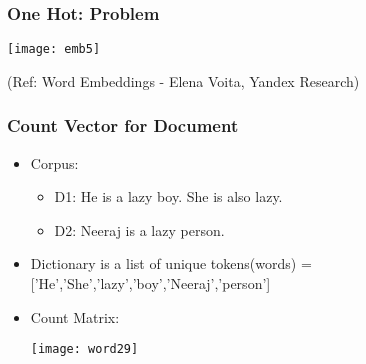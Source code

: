 \begin{frame}[fragile]\frametitle{One Hot: Problem}
\begin{center}
\texttt{[image: emb5]}
\end{center}

{\tiny (Ref: Word Embeddings - Elena Voita, Yandex Research)}
\end{frame}








\begin{frame}[fragile]\frametitle{Count Vector for Document}
\begin{itemize}
\item Corpus:
\begin{itemize}
\item D1: He is a lazy boy. She is also lazy.
\item D2: Neeraj is a lazy person.
\end{itemize}
\item Dictionary is a list of unique tokens(words) =['He','She','lazy','boy','Neeraj','person'] 
\item Count Matrix:
\begin{center}
\texttt{[image: word29]}
\end{center}
\end{itemize}
\end{frame}

